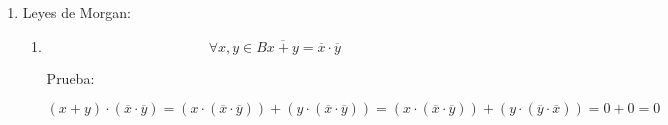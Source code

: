 \begin{enumerate}
\begin{enumerate}
\begin{enumerate}
\begin{enumerate}
\begin{enumerate}
          \[\mathit{De}{\lbrack\mathbf{1}\rbrack}y\mathit{de}{\lbrack\mathbf{2}\rbrack}\mathit{obtenemos}:\]

          \[{1 = {\overline{x} + {({x + y})}}} = {{({\overline{x} + x})} + y}\]
        \item
          \[{0 = {\overline{x} \cdot {({x \cdot y})}}} = {{({\overline{x} \cdot x})} \cdot y}\]

          Prueba:

          \[{\lbrack\mathbf{A}\rbrack}{{{{({\overline{x} \cdot {({x \cdot y})}})} + x} = {x \cdot {({x + y})}}} = x}\]

          \[{\lbrack\mathbf{B}\rbrack}{{{{({\overline{x} \cdot {({x \cdot y})}})} + \overline{x}} = {\overline{x} \cdot {({x + y})}}} = \overline{x}}\]

          \[\mathit{De}{\lbrack\mathbf{A}\rbrack}y\mathit{de}{\lbrack\mathbf{B}\rbrack}\mathit{obtenemos}{\lbrack\mathbf{1}\rbrack}:\]

          \[{\lbrack\mathbf{1}\rbrack}{{{0 = {x \cdot \overline{x}}} = {{({{({\overline{x} \cdot {({x \cdot y})}})} + x})} \cdot {({{({\overline{x} \cdot {({x \cdot y})}})} \cdot \overline{x}})}}} =}\]

          \[{{= {{({\overline{x} \cdot {({x \cdot y})}})} + {({x \cdot \overline{x}})}}} = {{({\overline{x} \cdot {({x \cdot y})}})} + 0}} = {\overline{x} \cdot {({x \cdot y})}}\]

          \[{\lbrack\mathbf{2}\rbrack}{{0 = {0 \cdot y}} = {{({\overline{x} \cdot x})} \cdot y}}\]

          \[\mathit{De}{\lbrack\mathbf{1}\rbrack}y\mathit{de}{\lbrack\mathbf{2}\rbrack}\mathit{obtenemos}:\]

          \[{0 = {\overline{x} \cdot {({x \cdot y})}}} = {{({\overline{x} \cdot x})} \cdot y}\]
        \end{enumerate}
      \end{enumerate}
    \item
      Leyes de Morgan:

      \begin{enumerate}
      \def\labelenumiv{\arabic{enumiv}.}
      \item
        \[\forall x,{y \in B}{\overline{x+y} = {\overline{x} \cdot \overline{y}}}\]

        Prueba:

        \[{{{{{({x + y})} \cdot {({\overline{x} \cdot \overline{y}})}} = {{({x \cdot {({\overline{x} \cdot \overline{y}})}})} + {({y \cdot {({\overline{x} \cdot \overline{y}})}})}}} = {{({x \cdot {({\overline{x} \cdot \overline{y}})}})} + {({y \cdot {({\overline{y} \cdot \overline{x}})}})}}} = {0 + 0}} = 0\]


\end{enumerate}
\end{enumerate}
\end{enumerate}
\end{enumerate}
